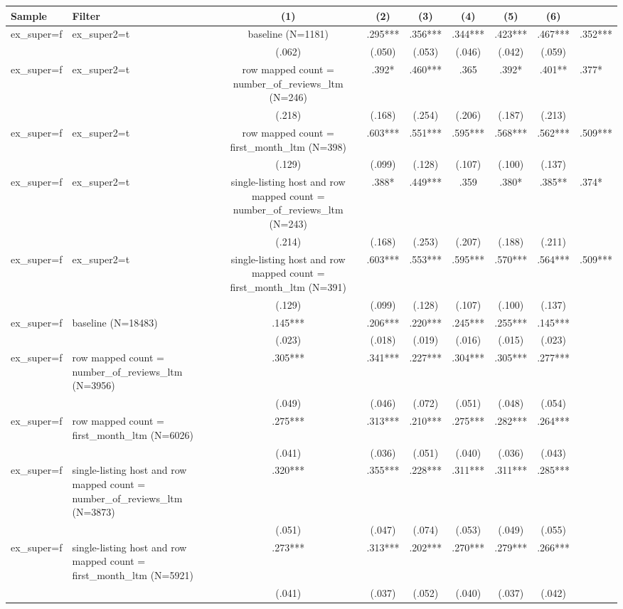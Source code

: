 \begin{tabular}{llcccccc}
\hline
Sample & Filter & (1) & (2) & (3) & (4) & (5) & (6) \\
\hline
ex_super=f & ex_super2=t & baseline (N=1181) & .295*** & .356*** & .344*** & .423*** & .467*** & .352***
\\
 &  & (.062) & (.050) & (.053) & (.046) & (.042) & (.059)
\\
ex_super=f & ex_super2=t & row mapped count = number_of_reviews_ltm (N=246) & .392* & .460*** & .365 & .392* & .401** & .377*
\\
 &  & (.218) & (.168) & (.254) & (.206) & (.187) & (.213)
\\
ex_super=f & ex_super2=t & row mapped count = first_month_ltm (N=398) & .603*** & .551*** & .595*** & .568*** & .562*** & .509***
\\
 &  & (.129) & (.099) & (.128) & (.107) & (.100) & (.137)
\\
ex_super=f & ex_super2=t & single-listing host and row mapped count = number_of_reviews_ltm (N=243) & .388* & .449*** & .359 & .380* & .385** & .374*
\\
 &  & (.214) & (.168) & (.253) & (.207) & (.188) & (.211)
\\
ex_super=f & ex_super2=t & single-listing host and row mapped count = first_month_ltm (N=391) & .603*** & .553*** & .595*** & .570*** & .564*** & .509***
\\
 &  & (.129) & (.099) & (.128) & (.107) & (.100) & (.137)
\\
ex_super=f & baseline (N=18483) & .145*** & .206*** & .220*** & .245*** & .255*** & .145***
\\
 &  & (.023) & (.018) & (.019) & (.016) & (.015) & (.023)
\\
ex_super=f & row mapped count = number_of_reviews_ltm (N=3956) & .305*** & .341*** & .227*** & .304*** & .305*** & .277***
\\
 &  & (.049) & (.046) & (.072) & (.051) & (.048) & (.054)
\\
ex_super=f & row mapped count = first_month_ltm (N=6026) & .275*** & .313*** & .210*** & .275*** & .282*** & .264***
\\
 &  & (.041) & (.036) & (.051) & (.040) & (.036) & (.043)
\\
ex_super=f & single-listing host and row mapped count = number_of_reviews_ltm (N=3873) & .320*** & .355*** & .228*** & .311*** & .311*** & .285***
\\
 &  & (.051) & (.047) & (.074) & (.053) & (.049) & (.055)
\\
ex_super=f & single-listing host and row mapped count = first_month_ltm (N=5921) & .273*** & .313*** & .202*** & .270*** & .279*** & .266***
\\
 &  & (.041) & (.037) & (.052) & (.040) & (.037) & (.042)
\\
\hline
\end{tabular}
